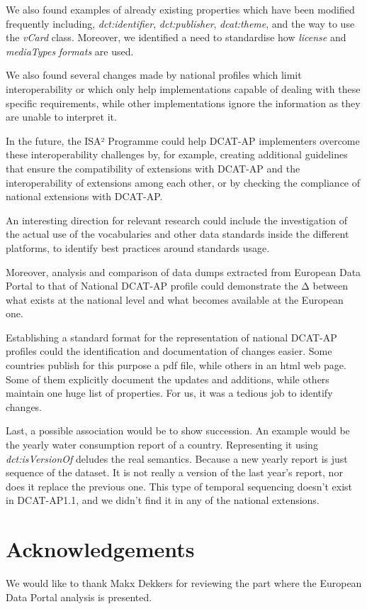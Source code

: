 \documentclass[<options>]{elsarticle}
\begin{document}
We also found examples of already existing properties which have been modified frequently including, \textit{dct:identifier}, \textit{dct:publisher}, \textit{dcat:theme}, and the way to use the \textit{vCard }class. Moreover, we identified a need to standardise how \textit{license} and \textit{mediaTypes} \textit{formats }are used. 

We also found several changes made by national profiles which limit interoperability or which only help implementations capable of dealing with these specific requirements, while other implementations ignore the information as they are unable to interpret it. 

In the future, the ISA² Programme could help DCAT-AP implementers overcome these interoperability challenges by, for example, creating additional guidelines that ensure the compatibility of extensions with DCAT-AP and the interoperability of extensions among each other, or by checking the compliance of national extensions with DCAT-AP.

An interesting direction for relevant research could include the investigation of the actual use of the vocabularies and other data standards inside the different platforms, to identify best practices around standards usage. 

Moreover, analysis and comparison of data dumps extracted from European Data Portal to that of National DCAT-AP profile could demonstrate the Δ between what exists at the national level and what becomes available at the European one. 

Establishing a standard format for the representation of national DCAT-AP profiles could the identification and documentation of changes easier. Some countries publish for this purpose a pdf file, while others in an html web page. Some of them explicitly document the updates and additions, while others maintain one huge list of properties. For us, it was a tedious job to identify changes.
 
Last, a possible association would be to show succession. An example would be the yearly water consumption report of a country. Representing it using \textit{dct:isVersionOf }deludes the real semantics. Because a new yearly report is just sequence of the dataset. It is not really a version of the last year’s report, nor does it replace the previous one. This type of temporal sequencing doesn’t exist in DCAT-AP1.1, and we didn’t find it in any of the national extensions. 

\section{Acknowledgements}
We would like to thank Makx Dekkers for reviewing the part where the European Data Portal analysis is presented.
\end{document}
